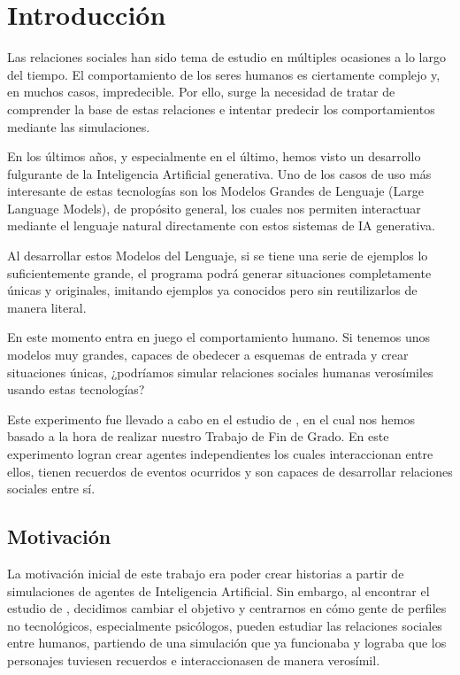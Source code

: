 \chapter{Introducción}
\label{cap:introduccion}


Las relaciones sociales han sido tema de estudio en múltiples ocasiones a lo largo del tiempo. El comportamiento de los seres humanos es ciertamente complejo y, en muchos casos, impredecible. Por ello, surge la necesidad de tratar de comprender la base de estas relaciones e intentar predecir los comportamientos mediante las simulaciones.

En los últimos años, y especialmente en el último, hemos visto un desarrollo fulgurante de la Inteligencia Artificial generativa. Uno de los casos de uso más interesante de estas tecnologías son los Modelos Grandes de Lenguaje (Large Language Models), de propósito general, los cuales nos permiten interactuar mediante el lenguaje natural directamente con estos sistemas de IA generativa.

Al desarrollar estos Modelos del Lenguaje, si se tiene una serie de ejemplos lo suficientemente grande, el programa podrá generar situaciones completamente únicas y originales, imitando ejemplos ya conocidos pero sin reutilizarlos de manera literal.

En este momento entra en juego el comportamiento humano. Si tenemos unos modelos muy grandes, capaces de obedecer a esquemas de entrada y crear situaciones únicas, ¿podríamos simular relaciones sociales humanas verosímiles usando estas tecnologías?

Este experimento fue llevado a cabo en el estudio de \cite{park2023generative}, en el cual nos hemos basado a la hora de realizar nuestro Trabajo de Fin de Grado. En este experimento logran crear agentes independientes los cuales interaccionan entre ellos, tienen recuerdos de eventos ocurridos y son capaces de desarrollar relaciones sociales entre sí.

\section{Motivación}
La motivación inicial de este trabajo era poder crear historias a partir de simulaciones de agentes de Inteligencia Artificial. Sin embargo, al encontrar el estudio de \ga \citep{park2023generative}, decidimos cambiar el objetivo y centrarnos en cómo gente de perfiles no tecnológicos, especialmente psicólogos, pueden estudiar las relaciones sociales entre humanos, partiendo de una simulación que ya funcionaba y lograba que los personajes tuviesen recuerdos e interaccionasen de manera verosímil.


